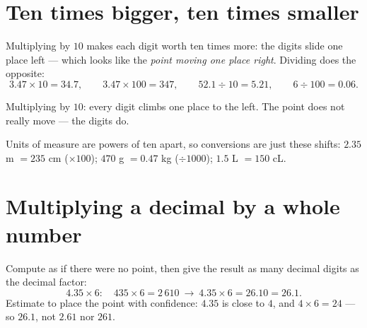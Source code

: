 \section{Ten times bigger, ten times smaller}

\begin{proposition}\label{prop:g5:decimalops:shift}
Multiplying by $10$ makes each digit worth ten times more: the
digits slide one place left --- which looks like the \emph{point
moving one place right}. Dividing does the opposite:
\[
3.47 \times 10 = 34.7, \qquad
3.47 \times 100 = 347, \qquad
52.1 \div 10 = 5.21, \qquad
6 \div 100 = 0.06 .
\]
\end{proposition}
\admitted

\begin{omfigure}

{\small Multiplying by $10$: every digit climbs one place to the
left. The point does not really move --- the digits do.}
\end{omfigure}

\begin{example}\label{ex:g5:decimalops:convert}
Units of measure are powers of ten apart, so conversions are just
these shifts: $2.35$ m $= 235$ cm ($\times 100$); $470$ g
$= 0.47$ kg ($\div 1000$); $1.5$ L $= 150$ cL.
\end{example}

\section{Multiplying a decimal by a whole number}

\begin{method}\label{met:g5:decimalops:mult}
Compute as if there were no point, then give the result as many
decimal digits as the decimal factor:
\[
4.35 \times 6: \quad 435 \times 6 = 2\,610
\ \to\ 4.35 \times 6 = 26.10 = 26.1 .
\]
Estimate to place the point with confidence: $4.35$ is close to
$4$, and $4 \times 6 = 24$ --- so $26.1$, not $2.61$ nor $261$.
\end{method}

